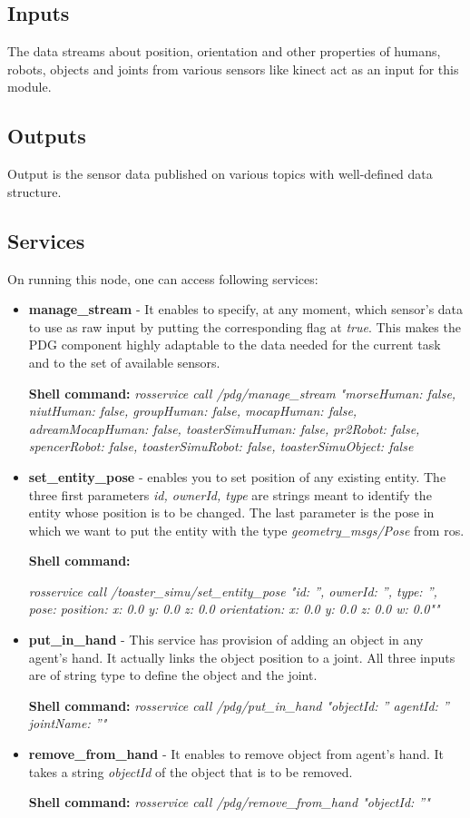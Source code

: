 \documentclass[a4paper]{article}
\begin{document}
\subsection{Inputs}
The data streams about position, orientation and other properties of humans, robots, objects and joints from various sensors like kinect act as an input for this module.
\subsection{Outputs}
Output is the sensor data published on various topics with well-defined data structure.
\subsection{Services}
On running this node, one can access following services:
\begin{itemize}
\item \textbf{manage\_stream} - It enables to specify, at any moment, which sensor's data to use as raw input by putting the corresponding flag at \textit{true}. This makes the PDG component highly adaptable to the data needed for the current task and to the set of available sensors. 

\textbf{Shell command:}
\textit{rosservice call /pdg/manage\_stream "{morseHuman: false, niutHuman: false, groupHuman: false, mocapHuman: false, adreamMocapHuman: false,
  toasterSimuHuman: false, pr2Robot: false, spencerRobot: false, toasterSimuRobot: false,
  toasterSimuObject: false}}
  
\item \textbf{set\_entity\_pose} - enables you to set position of any existing entity. The three first parameters \textit{id, ownerId, type} are strings meant to identify the entity whose position is to be changed. The last parameter is the pose in which we want to put the entity with the type \textit{geometry\_msgs/Pose} from ros.

\textbf{Shell command:}

\textit{ rosservice call /toaster\_simu/set\_entity\_pose "{id: '', 
 ownerId: '', 
 type: '', 
 pose:
  position:
    x: 0.0
    y: 0.0
    z: 0.0
  orientation:
    x: 0.0
    y: 0.0
    z: 0.0
    w: 0.0"}" }
 

\item \textbf{put\_in\_hand} - This service has provision of adding an object in any agent's hand. It actually links the object position to a joint. All three inputs are of string type to define the object and the joint.

\textbf{Shell command:}
\textit{rosservice call /pdg/put\_in\_hand "objectId: ''
agentId: ''
jointName: ''" }

\item \textbf{remove\_from\_hand} - It enables to remove object from agent's hand. It takes a string \textit{objectId} of the object that is to be removed.

\textbf{Shell command:}
\textit{rosservice call /pdg/remove\_from\_hand "objectId: ''" }

\end{itemize}
\end{document}
